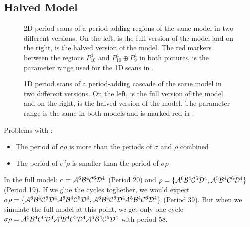 \subsection{Halved Model}


\begin{figure}
    \centering
    \caption{
        2D period scans of a period adding regions of the same model in two different versions.
        On the left, is the full version of the model and on the right, is the halved version of the model.
        The red markers between the regions $P_{10}^4$ and $P_{10}^4 \oplus P_9^4$ in both pictures, is the parameter range used for the 1D scans in .
    }
    \label{fig:minrep.adding1.corner.period}
\end{figure}

\begin{figure}
    \centering
    \caption{
        1D period scans of a period-adding cascade of the same model in two different versions.
        On the left, is the full version of the model and on the right, is the halved version of the model.
        The parameter range is the same in both models and is marked red in .
    }
    \label{fig:minrep.adding1.motivation.halved.1d.period}
\end{figure}

Problems with :
\begin{itemize}
    \item The period of $\sigma\rho$ is more than the periods of $\sigma$ and $\rho$ combined
    \item The period of $\sigma^2\rho$ is smaller than the period of $\sigma\rho$
\end{itemize}

In the full model: $\sigma = \mathcal{A}^6\mathcal{B}^4\mathcal{C}^6\mathcal{D}^4$ (Period 20) and $\rho = \{\mathcal{A}^6\mathcal{B}^4\mathcal{C}^5\mathcal{D}^4, \mathcal{A}^5\mathcal{B}^4\mathcal{C}^6\mathcal{D}^4\}$ (Period 19).
If we glue the cycles toghether, we would expect $\sigma\rho = \{\mathcal{A}^6\mathcal{B}^4\mathcal{C}^6\mathcal{D}^4\mathcal{A}^6\mathcal{B}^4\mathcal{C}^5\mathcal{D}^4, \mathcal{A}^6\mathcal{B}^4\mathcal{C}^6\mathcal{D}^4A^5\mathcal{B}^4\mathcal{C}^6\mathcal{D}^4\}$ (Period 39).
But when we simulate the full model at this point, we get only one cycle $\sigma\rho = \mathcal{A}^5\mathcal{B}^4\mathcal{C}^6\mathcal{D}^4\mathcal{A}^6\mathcal{B}^4\mathcal{C}^5\mathcal{D}^4\mathcal{A}^6\mathcal{B}^4\mathcal{C}^6\mathcal{D}^4$ with period 58.

